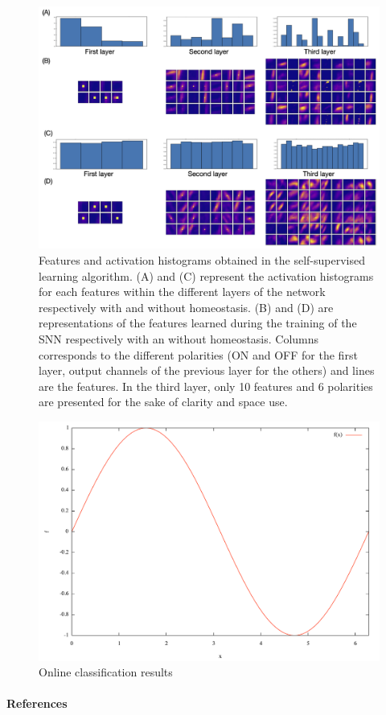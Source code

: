 \documentclass[12pt]{article}
\begin{document}
\begin{figure}[!ht]%
\centering
\includegraphics[width=.9\linewidth]{layerz.png}
\caption
{Features and activation histograms obtained in the self-supervised learning algorithm. (A) and (C) represent the activation histograms for each features within the different layers of the network respectively with and without homeostasis. (B) and (D) are representations of the features learned during the training of the SNN respectively with an without homeostasis. Columns corresponds to the different polarities (ON and OFF for the first layer, output channels of the previous layer for the others) and lines are the features. In the third layer, only 10 features and 6 polarities are presented for the sake of clarity and space use.
\label{fig:fig2}
}
\end{figure}

\begin{figure}[!ht]%
\centering
\includegraphics[width=.7\linewidth, height=0.25\linewidth]{figure1.pdf}
\caption
{Online classification results
\label{fig:fig3}
}
\end{figure}

%
\paragraph*{References}
{
\printbibliography[heading=none]
}

\end{document}
